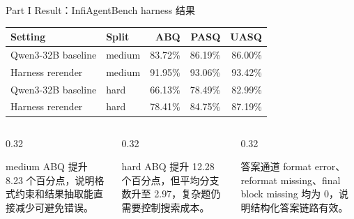 \documentclass[aspectratio=169,UTF8]{ctexbeamer}
\begin{document}
\begin{frame}{Part I Result：InfiAgentBench harness 结果}
\footnotesize
\begin{tabularx}{\textwidth}{p{} p{} r r r}
\toprule
Setting & Split & ABQ & PASQ & UASQ \\
\midrule
Qwen3-32B baseline & medium & 83.72\% & 86.19\% & 86.00\% \\
Harness rerender & medium & 91.95\% & 93.06\% & 93.42\% \\
\midrule
Qwen3-32B baseline & hard & 66.13\% & 78.49\% & 82.99\% \\
Harness rerender & hard & 78.41\% & 84.75\% & 87.19\% \\
\bottomrule
\end{tabularx}
\vspace{0.65em}
\begin{columns}[T]
\begin{column}{0.32\textwidth}
\begin{block}{medium}
ABQ 提升 8.23 个百分点，说明格式约束和结果抽取能直接减少可避免错误。
\end{block}
\end{column}
\begin{column}{0.32\textwidth}
\begin{block}{hard}
ABQ 提升 12.28 个百分点，但平均分支数升至 2.97，复杂题仍需要控制搜索成本。
\end{block}
\end{column}
\begin{column}{0.32\textwidth}
\begin{block}{答案通道}
format error、reformat missing、final block missing 均为 0，说明结构化答案链路有效。
\end{block}
\end{column}
\end{columns}
\end{frame}
\end{document}
